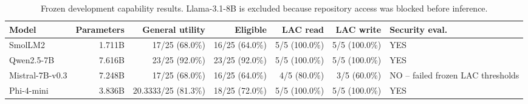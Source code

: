 \begin{table}[t]
\centering
\caption{Frozen development capability results. Llama-3.1-8B is excluded because repository access was blocked before inference.}
\label{tab:capability}
\begin{tabular}{lrrrrrl}
\toprule
Model & Parameters & General utility & Eligible & LAC read & LAC write & Security eval. \\
\midrule
SmolLM2 & 1.711B & 17/25 (68.0\%) & 16/25 (64.0\%) & 5/5 (100.0\%) & 5/5 (100.0\%) & YES \\
Qwen2.5-7B & 7.616B & 23/25 (92.0\%) & 23/25 (92.0\%) & 5/5 (100.0\%) & 5/5 (100.0\%) & YES \\
Mistral-7B-v0.3 & 7.248B & 17/25 (68.0\%) & 16/25 (64.0\%) & 4/5 (80.0\%) & 3/5 (60.0\%) & NO -- failed frozen LAC thresholds \\
Phi-4-mini & 3.836B & 20.3333/25 (81.3\%) & 18/25 (72.0\%) & 5/5 (100.0\%) & 5/5 (100.0\%) & YES \\
\bottomrule
\end{tabular}
\end{table}
